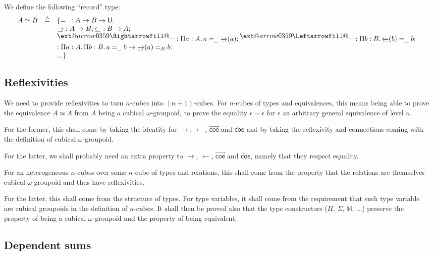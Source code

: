 \documentclass{article}
\makeatletter
\newcommand{\Overrightarrow}[2]{\raisebox{#1}{$\ext@arrow 0359\Rightarrowfill@{\mbox{${#2}$}}{}$}}
\newcommand{\Overleftarrow}[2]{\raisebox{#1}{$\ext@arrow 0359\Leftarrowfill@{\mbox{${#2}$}}{}$}}
\newcommand{\sort}[1]{\mathsf{U}_{#1}}
\newcommand{\defeq}{\triangleq}
\makeatother
\begin{document}
We define the following ``record'' type:
$$
\begin{array}{lcl}
  A \simeq B & \defeq & \{=_{\_}\, : A \rightarrow B \rightarrow \sort;\\
& & \overrightarrow{\_} : A \rightarrow B; \overleftarrow{\_} : B \rightarrow A; \\
& & \Overrightarrow{1ex}{\_} : \Pi a:A.\, a =_{\_} \overrightarrow{\_}(a); \Overleftarrow{1ex}{\_} : \Pi b:B.\, \overleftarrow{\_}(b) =_{\_} b; \\
& &  : \Pi a:A.\,\Pi b:B.\, a =_{\_} b \rightarrow \overrightarrow{\_}(a) =_B b;\\
& & ...\}
\end{array}
$$
\fi
\iffalse %
\subsection{Reflexivities}

We need to provide reflexivities to turn $n$-cubes into
$(n+1)$-cubes. For $n$-cubes of types and equivalences, this means
being able to prove the equivalence $A \simeq A$ from $A$ being a
cubical $\omega$-groupoid, to prove the equality $\epsilon = \epsilon$
for $\epsilon$ an arbitrary general equivalence of level $n$.

For the former, this shall come by taking the identity for
$\rightarrow$, $\leftarrow$, $\overrightarrow{\mathsf{coe}}$ and
$\overleftarrow{\mathsf{coe}}$ and by taking the reflexivity and
connections coming with the definition of cubical $\omega$-groupoid.

For the latter, we shall probably need an extra property to
$\rightarrow$, $\leftarrow$, $\overrightarrow{\mathsf{coe}}$ and
$\overleftarrow{\mathsf{coe}}$, namely that they respect equality.

For an heterogeneous $n$-cubes over some $n$-cube of types and
relations, this shall come from the property that the relations are
themselves cubical $\omega$-groupoid and thus have reflexivities.

For the latter, this shall come from the structure of types.  For type
variables, it shall come from the requirement that such type variable
are cubical groupoids in the definition of $n$-cubes. It shall then be
proved also that the type constructors ($\Pi$, $\Sigma$, $\mathbb{N}$,
...) preserve the property of being a cubical $\omega$-groupoid and
the property of being equivalent.

\subsection{Dependent sums}
\end{document}
